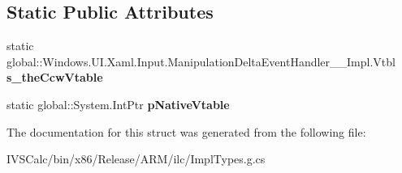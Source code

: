 \subsection*{Static Public Attributes}
\begin{DoxyCompactItemize}
\item 
\mbox{\label{struct_windows_1_1_u_i_1_1_xaml_1_1_input_1_1_manipulation_delta_event_handler_____impl_1_1_vtbl_a543b97937d535fa582f51cccc914622d}} 
static global\+::\+Windows.\+U\+I.\+Xaml.\+Input.\+Manipulation\+Delta\+Event\+Handler\+\_\+\+\_\+\+Impl.\+Vtbl {\bfseries s\+\_\+the\+Ccw\+Vtable}
\item 
\mbox{\label{struct_windows_1_1_u_i_1_1_xaml_1_1_input_1_1_manipulation_delta_event_handler_____impl_1_1_vtbl_a9fec38f1f53f1ff2d2c43f976ec0a324}} 
static global\+::\+System.\+Int\+Ptr {\bfseries p\+Native\+Vtable}
\end{DoxyCompactItemize}


The documentation for this struct was generated from the following file\+:\begin{DoxyCompactItemize}
\item 
I\+V\+S\+Calc/bin/x86/\+Release/\+A\+R\+M/ilc/Impl\+Types.\+g.\+cs\end{DoxyCompactItemize}
